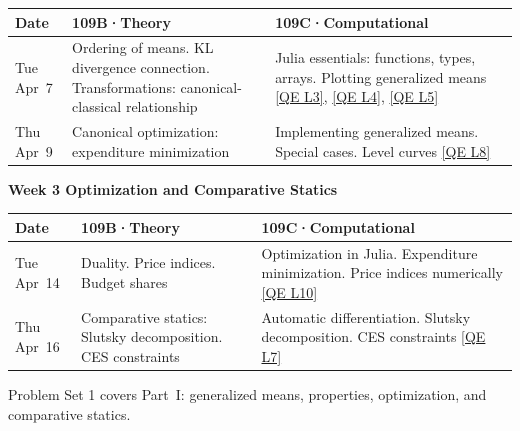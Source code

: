 \begin{tabularx}{\textwidth}{@{}p{2.1cm}YY@{}}
\toprule
\textbf{Date} & \textbf{109B\enspace·\enspace Theory} & \textbf{109C\enspace·\enspace Computational} \\
\midrule
Tue Apr~7 &
Ordering of means. KL divergence connection. Transformations: canonical-classical relationship &
Julia essentials: functions, types, arrays. Plotting generalized means \newline
\href{https://julia.quantecon.org/getting_started_julia/julia_essentials.html}{[QE L3]},
\href{https://julia.quantecon.org/getting_started_julia/fundamental_types.html}{[QE L4]},
\href{https://julia.quantecon.org/getting_started_julia/introduction_to_types.html}{[QE L5]} \\[4pt]
Thu Apr~9 &
Canonical optimization: expenditure minimization &
Implementing generalized means. Special cases. Level curves \newline
\href{https://julia.quantecon.org/more_julia/quadrature_interpolation.html}{[QE L8]} \\
\bottomrule
\end{tabularx}

\vspace{0.8em}
\noindent\textbf{Week 3 \hfill Optimization and Comparative Statics}
\vspace{0.3em}

\begin{tabularx}{\textwidth}{@{}p{2.1cm}YY@{}}
\toprule
\textbf{Date} & \textbf{109B\enspace·\enspace Theory} & \textbf{109C\enspace·\enspace Computational} \\
\midrule
Tue Apr~14 &
Duality. Price indices. Budget shares &
Optimization in Julia. Expenditure minimization. Price indices numerically \newline
\href{https://julia.quantecon.org/more_julia/optimization_solver_packages.html}{[QE L10]} \\[4pt]
Thu Apr~16 &
Comparative statics: Slutsky decomposition. CES constraints &
Automatic differentiation. Slutsky decomposition. CES constraints \newline
\href{https://julia.quantecon.org/more_julia/auto_differentiation.html}{[QE L7]} \\
\bottomrule
\end{tabularx}

\begin{calloutnote}
Problem Set 1 covers Part~I: generalized means, properties, optimization, and comparative statics.
\end{calloutnote}

